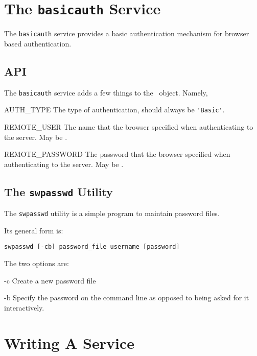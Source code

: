 \documentclass{manual}
\begin{document}
\chapter{The \texttt{basicauth} Service}

The \texttt{basicauth} service provides a basic authentication
mechanism for browser based authentication.

\section{API}
The \texttt{basicauth} service adds a few things to the
\connection\ object.  Namely,
\begin{memberdesc}[string]{AUTH_TYPE} The type of authentication,
should always be \verb!'Basic'!.
\end{memberdesc}
\begin{memberdesc}[string]{REMOTE_USER} The name that the browser
specified when authenticating to the server.  May be \None.
\end{memberdesc}
\begin{memberdesc}[string]{REMOTE_PASSWORD} The password that the browser
specified when authenticating to the server.  May be \None.
\end{memberdesc}

\section{The \texttt{swpasswd} Utility}
The \texttt{swpasswd} utility is a simple program to maintain
password files.  

Its general form is:
\begin{verbatim}
swpasswd [-cb] password_file username [password]
\end{verbatim}

The two options are:
\begin{argdesc}
\item[-c] Create a new password file
\item[-b] Specify the password on the command line as opposed to being
asked for it interactively.
\end{argdesc}


\chapter{Writing A Service}
\end{document}
